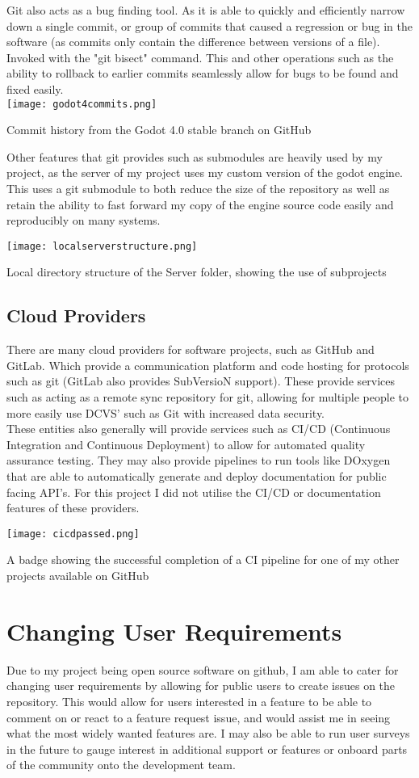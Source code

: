\documentclass[12pt, DIV=calc]{scrartcl}
\begin{document}
Git also acts as a bug finding tool. As it is able to quickly and efficiently narrow down a single commit, or group of commits that caused a regression or bug in the software (as commits only contain the difference between versions of a file). Invoked with the "git bisect" command. This and other operations such as the ability to rollback to earlier commits seamlessly allow for bugs to be found and fixed easily.\\

\texttt{[image: godot4commits.png]}
\caption{Commit history from the Godot 4.0 stable branch on GitHub \cite{godotgithub}}

Other features that git provides such as submodules are heavily used by my project, as the server of my project uses my custom version of the godot engine. This uses a git submodule to both reduce the size of the repository as well as retain the ability to fast forward my copy of the engine source code easily and reproducibly on many systems.

\texttt{[image: localserverstructure.png]}
\caption{Local directory structure of the Server folder, showing the use of subprojects}

\subsection{Cloud Providers}
There are many cloud providers for software projects, such as GitHub and GitLab. Which provide a communication platform and code hosting for protocols such as git (GitLab also provides SubVersioN support). These provide services such as acting as a remote sync repository for git, allowing for multiple people to more easily use DCVS' such as Git with increased data security.\\

These entities also generally will provide services such as CI/CD (Continuous Integration and Continuous Deployment) to allow for automated quality assurance testing. They may also provide pipelines to run tools like DOxygen that are able to automatically generate and deploy documentation for public facing API's. For this project I did not utilise the CI/CD or documentation features of these providers.

\texttt{[image: cicdpassed.png]}
\caption{A badge showing the successful completion of a CI pipeline for one of my other projects available on GitHub}


\clearpage
\section{Changing User Requirements}
Due to my project being open source software on github, I am able to cater for changing user requirements by allowing for public users to create issues on the repository. This would allow for users interested in a feature to be able to comment on or react to a feature request issue, and would assist me in seeing what the most widely wanted features are. I may also be able to run user surveys in the future to gauge interest in additional support or features or onboard parts of the community onto the development team. \\
\end{document}
